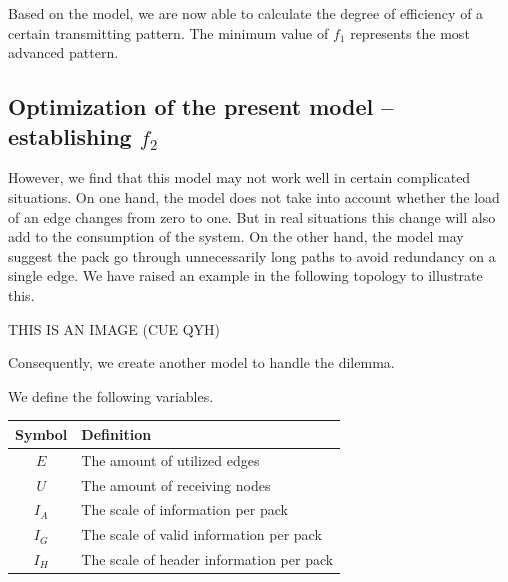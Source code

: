 \documentclass{mcmthesis}
\begin{document}
Based on the model, we are now able to calculate the degree of efficiency of a certain transmitting pattern. The minimum value of $f_1$ represents the most advanced pattern.

\subsection{Optimization of the present model -- establishing $f_2$}

However, we find that this model may not work well in certain complicated situations. On one hand, the model does not take into account whether the load of an edge changes from zero to one. But in real situations this change will also add to the consumption of the system. On the other hand, the model may suggest the pack go through unnecessarily long paths to avoid redundancy on a single edge. We have raised an example in the following topology to illustrate this.

THIS IS AN IMAGE (CUE QYH)

Consequently, we create another model to handle the dilemma.

We define the following variables.

\begin{center}
	\begin{tabular}{cl}
		\hline
		Symbol  & Definition                               \\
		\hline
		$E$     & The amount of utilized edges             \\
		$U$     & The amount of receiving nodes            \\
		$I_{A}$ & The scale of information per pack        \\
		$I_{G}$ & The scale of valid information per pack  \\
		$I_{H}$ & The scale of header information per pack \\
		\hline
	\end{tabular}
\end{center}
\end{document}
